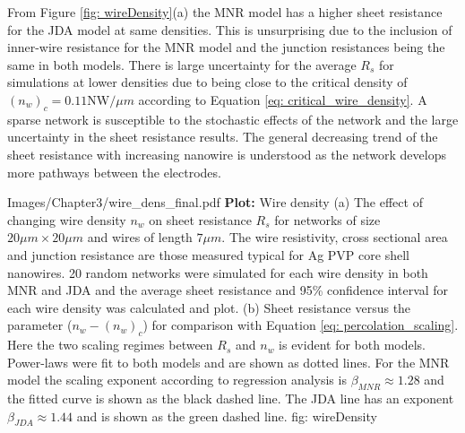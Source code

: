 From Figure  \ref{fig: wireDensity}(a) the MNR model has a higher sheet resistance for the JDA model at same densities. This is unsurprising due to the inclusion of inner-wire resistance for the MNR model and the junction resistances being the same in both models. There is large uncertainty for the average $R_s$ for simulations at lower densities due to being close to the critical density of $(n_w)_c = 0.11$NW$/\mu m$ according to Equation \ref{eq: critical_wire_density}. A sparse network is susceptible to the stochastic effects of the network and the large uncertainty in the sheet resistance results. The general decreasing trend of the sheet resistance with increasing nanowire is understood as the network develops more pathways between the electrodes. 

{Images/Chapter3/wire_dens_final.pdf}
{\textbf{Plot:} Wire density}
{(a) The effect of changing wire density $n_w$ on sheet resistance $R_s$ for networks of size $20\mu m \times 20 \mu m$ and wires of length $7 \mu m$. The wire resistivity, cross sectional area and junction resistance are those measured typical for Ag PVP core shell nanowires. 20 random networks were simulated for each wire density in both MNR and JDA and the average sheet resistance and 95\% confidence interval for each wire density was calculated and plot. (b) Sheet resistance versus the parameter ($n_w - (n_w)_c$) for comparison with Equation \ref{eq: percolation_scaling}. Here the two scaling regimes between $R_s$ and $n_w$ is evident for both models. Power-laws were fit to both models and are shown as dotted lines. For the MNR model the scaling exponent according to regression analysis is $\beta_{MNR} \approx 1.28$ and the fitted curve is shown as the black dashed line. The JDA line has an exponent $\beta_{JDA} \approx 1.44$ and is shown as the green dashed line.}
{fig: wireDensity}

